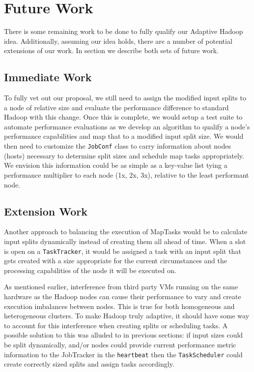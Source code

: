 \section{Future Work}
\label{section:futurework}

There is some remaining work to be done to fully qualify our Adaptive Hadoop idea. Additionally, 
assuming our idea holds, there are a number of potential extensions of our work. In section we
describe both sets of future work.

\subsection{Immediate Work}
To fully vet out our proposal, we still need to assign the modified input splits to a node
of relative size and evaluate the performance difference to standard Hadoop with this change.
Once this is complete, we would setup a test suite to automate performance evaluations as we
develop an algorithm to qualify a node's performance capabilities and map that to a modified
input split size. We would then need to customize the \texttt{JobConf} class to carry
information about nodes (hosts) necessary to determine split sizes and schedule map tasks
appropriately. We envision this information could be as simple as a key-value list tying
a performance multiplier to each node (1x, 2x, 3x), relative to the least performant node.

\subsection{Extension Work}
Another approach to balancing the execution of MapTasks would be to calculate input splits
dynamically instead of creating them all ahead of time. When a slot is open on a \texttt{TaskTracker}, it would
be assigned a task with an input split that gets created with a size appropriate for the current circumstances
and the processing capabilities of the node it will be executed on.

As mentioned earlier, interference from third party VMs running on the same hardware
as the Hadoop nodes can cause their performance to vary and create execution imbalances
between nodes. This is true for both
homogeneous and heterogeneous clusters. To make Hadoop truly adaptive, it should
have some way to account for this interference when creating splits or scheduling tasks. A possible
solution to this was alluded to in previous sections: if input sizes could be split dynamically, 
and/or nodes could provide current performance metric information to the JobTracker in the
\texttt{heartbeat} then the \texttt{TaskScheduler} could create correctly sized splits and 
assign tasks accordingly.
